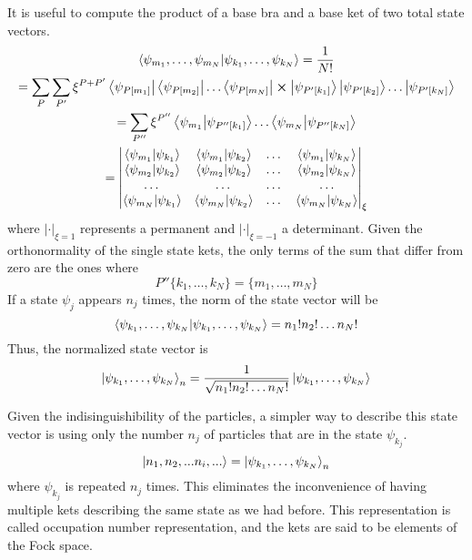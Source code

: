 It is useful to compute the product of a base bra and a base ket of two total state vectors.
\begin{multline} \label{eq:base_product}
    \bra{\psi_{m_1}, \dots, \psi_{m_N}} \ket{\psi_{k_1}, \dots, \psi_{k_N}} = \frac{1}{N!}
    \\ = \sum_P \sum_{P'} \xi^{P+P'} \bra{\psi_{P[m_1]}}\bra{\psi_{P[m_2]}}\dots\bra{\psi_{P[m_N]}} \cross \ket{\psi_{P'[k_1]}}\ket{\psi_{P'[k_2]}}\dots\ket{\psi_{P'[k_N]}}
    \\ = \sum_{P''} \xi^{P''} \braket{\psi_{m_1}}{\psi_{P''[k_1]}} \dots \braket{\psi_{m_N}}{\psi_{P''[k_N]}}
    \\ = \begin{vmatrix}
        \braket{\psi_{m_1}}{\psi_{k_1}} & \braket{\psi_{m_1}}{\psi_{k_2}} & \dots & \braket{\psi_{m_1}}{\psi_{k_N}} \\
        \braket{\psi_{m_2}}{\psi_{k_2}} & \braket{\psi_{m_2}}{\psi_{k_2}} & \dots & \braket{\psi_{m_2}}{\psi_{k_N}} \\
        \dots                           & \dots                           & \dots & \dots                           \\
        \braket{\psi_{m_N}}{\psi_{k_1}} & \braket{\psi_{m_N}}{\psi_{k_2}} & \dots & \braket{\psi_{m_N}}{\psi_{k_N}}
    \end{vmatrix}_\xi
\end{multline}
where $|\cdot|_{\xi = 1}$ represents a permanent and $|\cdot|_{\xi = -1}$ a determinant. Given the orthonormality of the single state kets, the only terms of the sum that differ from zero are the ones where
\begin{equation}
    P''\{k_1, \dots, k_N\} = \{m_1, \dots, m_N\}
\end{equation}
If a state $\psi_j$ appears $n_j$ times, the norm of the state vector will be
\begin{equation}
    \braket{\psi_{k_1}, \dots, \psi_{k_N}} = n_1!n_2!\dots n_N!
\end{equation}
Thus, the normalized state vector is
\begin{equation}
    \ket{\psi_{k_1}, \dots, \psi_{k_N}}_n= \frac{1}{\sqrt{n_1!n_2!\dots n_N!}} \ket{\psi_{k_1}, \dots, \psi_{k_N}}
\end{equation}

Given the indisinguishibility of the particles, a simpler way to describe this state vector is using only the number $n_j$ of particles that are in the state $\psi_{k_j}$.
\begin{equation} \label{eq:occupation_definition}
    \ket{n_1, n_2, ... n_i, ...} = \ket{\psi_{k_1}, \dots, \psi_{k_N}}_n
\end{equation}
where $\psi_{k_j}$ is repeated $n_j$ times. This eliminates the inconvenience of having multiple kets describing the same state as we had before. This representation is called occupation number representation, and the kets are said to be elements of the Fock space.

